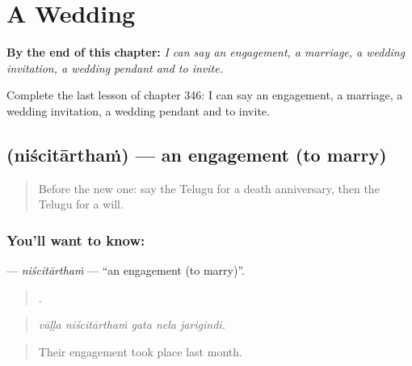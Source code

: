 
\chapter{A Wedding}
\label{ch:te-a-wedding}

\begin{chapteropening}
\textbf{By the end of this chapter:} \emph{I can say an engagement, a marriage, a wedding invitation, a wedding pendant and to invite.}

Complete the last lesson of chapter 346: I can say an engagement, a marriage, a wedding invitation, a wedding pendant and to invite.
\end{chapteropening}

\section[\texorpdfstring{\te{నిశ్చితార్థం} (niścitārthaṁ)}{నిశ్చితార్థం (niścitārthaṁ)}]{ (niścitārthaṁ) — an engagement (to marry)}

\label{lesson:TE-C346-niscitartham}



\begin{quote}
Before the new one: say the Telugu for a death anniversary, then the Telugu for a will.
\end{quote}

\subsection*{You'll want to know: }
\textbf{} — \emph{niścitārthaṁ} — \textquotedblleft{}an engagement (to marry)\textquotedblright{}.

\begin{quote}
    .
\end{quote}

\begin{quote}
\emph{vāḷḷa niścitārthaṁ gata nela jarigindi.}
\end{quote}

\begin{quote}
Their engagement took place last month.
\end{quote}

